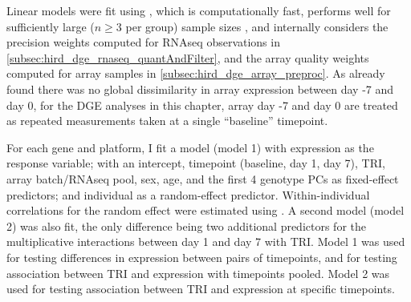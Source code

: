 Linear models were fit using  \autocite{ritchie2015LimmaPowersDifferential}, 
which is computationally fast, 
performs well for sufficiently large ($n \ge 3$ per group) sample sizes \autocite{soneson2013ComparisonMethodsDifferential},
and internally considers the precision weights computed for \gls{RNAseq} observations in \cref{subsec:hird_dge_rnaseq_quantAndFilter},
and the array quality weights computed for array samples in \cref{subsec:hird_dge_array_preproc}.
As \textcite{sobolev2016AdjuvantedInfluenzaH1N1Vaccination} already found there was no global dissimilarity in array expression between day -7 and day 0,
for the \gls{DGE} analyses in this chapter, 
array day -7 and day 0 are treated as repeated measurements taken at a single \enquote{baseline} timepoint.

For each gene and platform, I fit a model (model 1) with expression as the response variable; 
with an intercept, timepoint (baseline, day 1, day 7), \gls{TRI}, array batch/\gls{RNAseq} pool, sex, age, and the first 4 genotype \glspl{PC} as fixed-effect predictors;
and individual as a random-effect predictor.
Within-individual correlations for the random effect were estimated using .
A second model (model 2) was also fit, the only difference being two additional predictors for the multiplicative interactions between day 1 and day 7 with \gls{TRI}.
%
Model 1 was used for testing differences in expression between pairs of timepoints, and for testing association between \gls{TRI} and expression with timepoints pooled.
Model 2 was used for testing association between \gls{TRI} and expression at specific timepoints.

